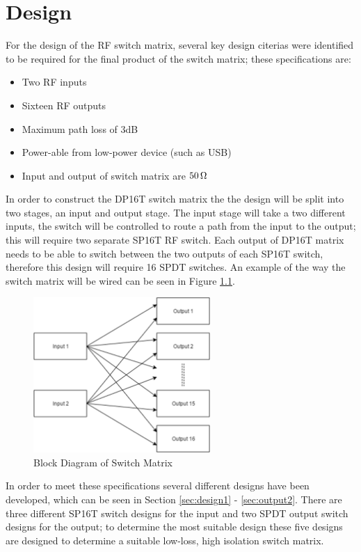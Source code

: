 \documentclass[12pt,openany,a4paper]{book}
\newcommand{\ohm}	{\ensuremath{\rm\,\Omega}}
\begin{document}
\chapter{Design}	\label{sec:design}
For the design of the RF switch matrix, several key design citerias were identified to be required for the final product of the switch matrix; these specifications are:
\begin{itemize}
	\setlength\itemsep{-0.5em}
	\item Two RF inputs
	\item Sixteen RF outputs
	\item Maximum path loss of $3$dB
	\item Power-able from low-power device (such as USB)
	\item Input and output of switch matrix are $50\ohm$
\end{itemize}
In order to construct the DP16T switch matrix the the design will be split into two stages, an input and output stage. The input stage will take a two different inputs, the switch will be controlled to route a path from the input to the output; this will require two separate SP16T RF switch. Each output of DP16T matrix needs to be able to switch between the two outputs of each SP16T switch, therefore this design will require 16 SPDT switches. An example of the way the switch matrix will be wired can be seen in Figure \ref{fig:block-swmtx}.\\[0.2cm]
\begin{figure}[h]
	\centering
    \includegraphics[width=0.6\textwidth]{switchmtx-block.png}
	\caption{Block Diagram of Switch Matrix}
	\label{fig:block-swmtx}
\end{figure} 
In order to meet these specifications several different designs have been developed, which can be seen in Section \ref{sec:design1} - \ref{sec:output2}. There are three different SP16T switch designs for the input and two SPDT output switch designs for the output; to determine the most suitable design these five designs are designed to determine a suitable low-loss, high isolation switch matrix. \\[0.2cm]
\end{document}
